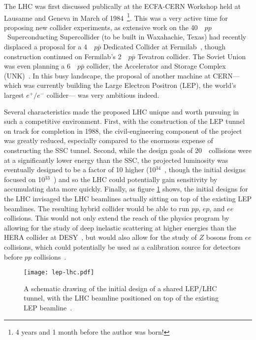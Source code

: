 The LHC was first discussed publically at the ECFA-CERN Workshop held at Lausanne and Geneva in March of 1984~\cite{ECFA1984}\footnote{4 years and 1 month before the author was born!}. This was a very active time for proposing new collider experiments, as extensive work on the 40~\TeV~$pp$~Superconducting Supercollider (to be built in Waxahachie, Texas) had recently displaced a proposal for a 4~\TeV~$p\bar{p}$ Dedicated Collider at Fermilab~\cite{ECFA1984,DC}, though construction continued on Fermilab's 2~\TeV~$p\bar{p}$ Tevatron collider. The Soviet Union was even planning a 6~\TeV~$p\bar{p}$ collider, the Accelerator and Storage Complex (UNK)~\cite{UNK}. In this busy landscape, the proposal of another machine at CERN--- which was currently building the Large Electron Positron (LEP), the world's largest $e^+/e^-$ collider--- was very ambitious indeed.

Several characteristics made the proposed LHC unique and worth pursuing in such a competitive environment. First, with the construction of the LEP tunnel on track for completion in 1988, the civil-engineering component of the project was greatly reduced, especially compared to the enormous expense of constructing the SSC tunnel. Second, while the design goals of 20~\TeV~collisions were at a significantly lower energy than the SSC, the projected luminosity was eventually designed to be a factor of 10 higher (10$^{34}$~\lumirate, though the initial designs focused on 10$^{33}$~\lumirate) and so the LHC could potentially gain sensitivity by accumulating data more quickly. Finally, as figure \ref{fig:lhc:lep-lhc} shows, the initial designs for the LHC invisaged the LHC beamlines actually sitting on top of the existing LEP beamlines. The resulting hybrid collider would be able to run $pp$, $ep$, and $ee$ collisions. This would not only extend the reach of the physics program by allowing for the study of deep inelastic scattering at higher energies than the HERA collider at DESY~\cite{Zeus,H1Zeus}, but would also allow for the study of $Z$ bosons from $ee$ collisions, which could potentially be used as a calibration source for detectors before $pp$ collisions~\cite{ECFA1984}.


\begin{figure}
\centering
\texttt{[image: lep-lhc.pdf]}
\caption{A schematic drawing of the initial design of a shared LEP/LHC tunnel, with the LHC beamline positioned on top of the existing LEP beamline~\cite{ECFA1984}.}
\label{fig:lhc:lep-lhc}
\end{figure}

